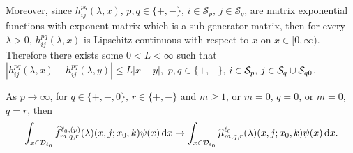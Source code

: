 Moreover, since \(h_{ij}^{pq}(\lambda,x)\), \(p,q\in \{+,-\}\), \(i\in\mathcal S_p,\,j\in\mathcal S_q\), are matrix exponential functions with exponent matrix which is a sub-generator matrix, then for every \(\lambda >0\), \(h_{ij}^{pq}(\lambda,x)\) is Lipschitz continuous with respect to \(x\) on \(x\in[0,\infty)\). Therefore there exists some \(0<L<\infty\) such that \(\left|h_{ij}^{pq}(\lambda,x)-h_{ij}^{pq}(\lambda,y)\right|\leq L|x-y|,\) \(p,q\in \{+,-\}\), \(i\in\mathcal S_p,\,j\in\mathcal S_q\cup\mathcal{S}_{q0}\).

\begin{thm}\label{thm: a thm!}
	As \(p\to \infty\), for \(q\in\{+,-,0\},\, r\in\{+,-\}\) and \(m\geq 1\), or \(m=0\), \(q=0\), or \(m=0\), \(q=r\), then
	\begin{align}\int_{x\in\mathcal{D}_{\ell_0}}\widehat f_{m,q,r}^{\ell_0,(p)}(\lambda)(x,j;x_0,k)\psi(x)\, \mathrm{d} x \to \int_{x\in\mathcal{D}_{\ell_0}}\widehat \mu_{m,q,r}^{\ell_0}(\lambda)(x,j;x_0,k)\psi(x)\, \mathrm{d} x.\label{eqn: thm 2}\end{align}
\end{thm}
